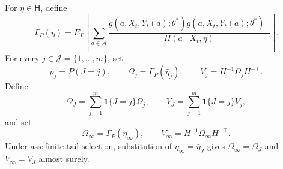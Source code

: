 For \(\eta\in\mathsf H\), define
\[
 \Gamma_P(\eta)=E_P\!\left[\sum_{a\in\mathcal A}
 \frac{g(a,X_t,Y_t(a);\theta^*)g(a,X_t,Y_t(a);\theta^*)^\top}
 {\Pi(a\mid X_t,\eta)}\right].
\]
For every \(j\in\mathcal J=\{1,\ldots,m\}\), set
\[
 p_j=P(J=j),\qquad
 \Omega_j=\Gamma_P(\bar\eta_j),\qquad
 V_j=H^{-1}\Omega_jH^{-\top}.
\]
Define
\[
 \Omega_J=\sum_{j=1}^m\mathbf1\{J=j\}\Omega_j,\qquad
 V_J=\sum_{j=1}^m\mathbf1\{J=j\}V_j,
\]
and set
\[
 \Omega_\infty=\Gamma_P(\eta_\infty),\qquad
 V_\infty=H^{-1}\Omega_\infty H^{-\top}.
\]
Under \(\mathrm{ass:finite\text{-}tail\text{-}selection}\), substitution of \(\eta_\infty=\bar\eta_J\) gives \(\Omega_\infty=\Omega_J\) and \(V_\infty=V_J\) almost surely.